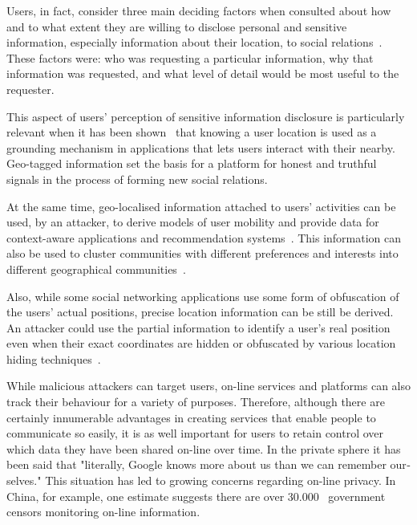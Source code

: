 Users, in fact, consider three main deciding factors when consulted about how and to what extent they are willing to disclose personal and sensitive information, especially information about their location, to social relations~\cite{consolvo2005location}. These factors were: who was requesting a particular information, why that information was requested, and what level of detail would be most useful to the requester. 

This aspect of users' perception of sensitive information disclosure is particularly relevant when it has been shown~\cite{toch2013locality} that knowing a user location is used as a grounding mechanism in applications that lets users interact with their nearby. Geo-tagged information set the basis for a platform for honest and truthful signals in the process of forming new social relations.

At the same time, geo-localised information attached to users' activities can be used, by an attacker, to derive models of user mobility and provide data for context-­aware applications and recommendation systems~\cite{melia-segui-et-al}. This information can also be used to cluster communities with different preferences and interests into different geographical communities~\cite{zhu-et-al}. 

Also, while some social networking applications use some form of obfuscation of the users' actual positions, precise location information can be still be derived. An attacker 
could use the partial information to identify a user's real position even when their exact coordinates are hidden or obfuscated  by  various  location  hiding  techniques~\cite{li2014all}.

While malicious attackers can target users, on-line services and platforms can also track their behaviour for a variety of purposes. Therefore, although there are certainly innumerable advantages in creating services that enable people to communicate so easily, it is as well important for users to retain control over which data they have been shared on-line over time. In the private sphere it has been said that "literally, Google knows more about us than we can remember our­selves." This situation has led to growing concerns regarding on-line privacy. In China, for example, one estimate suggests there are over 30.000~\cite{internet-freedom} government censors monitoring on-line information.

